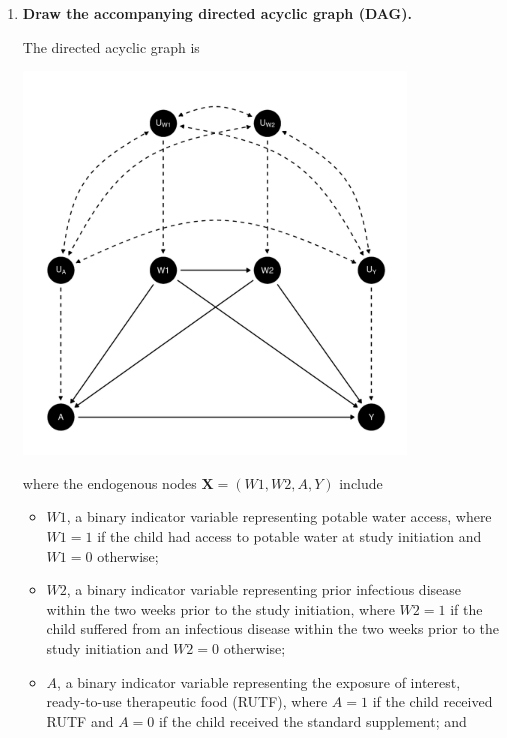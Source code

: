 \documentclass{article}\usepackage[]{graphicx}\usepackage[]{xcolor}
\newenvironment{knitrout}{}{} %
\begin{document}
  \begin{enumerate}[label=\textbf{\alph*.}]

    \item \textbf{Draw the accompanying directed acyclic graph (DAG).}
    
    The directed acyclic graph is
    
\begin{knitrout}
\color{fgcolor}
\includegraphics[width=4in]{figure/unnamed-chunk-2-1} 

\end{knitrout}

    where the endogenous nodes $\bm{X} = (W1, W2, A, Y)$ include
    
    \begin{itemize}
    
      \item $W1$, a binary indicator variable representing potable water access, where $W1 = 1$ if the child had access to potable water at study initiation and $W1 = 0$ otherwise;
      
      \item $W2$, a binary indicator variable representing prior infectious disease within the two weeks prior to the study initiation, where $W2 = 1$ if the child suffered from an infectious disease within the two weeks prior to the study initiation and $W2 = 0$ otherwise;
      
      \item $A$, a binary indicator variable representing the exposure of interest, ready-to-use therapeutic food (RUTF), where $A = 1$ if the child received RUTF and $A = 0$ if the child received the standard supplement; and
      

\end{itemize}
\end{enumerate}
\end{document}
